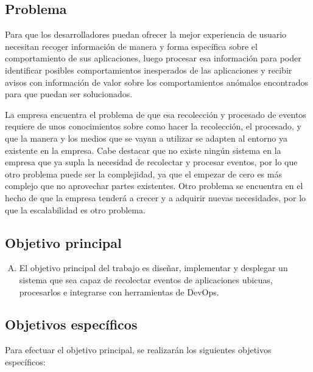 \subsection{Problema}
Para que los desarrolladores puedan ofrecer la mejor experiencia de usuario necesitan recoger información de manera y forma específica sobre el comportamiento de sus aplicaciones, luego procesar esa información para poder identificar posibles comportamientos inesperados de las aplicaciones y recibir avisos con información de valor sobre los comportamientos anómalos encontrados para que puedan ser solucionados.

La empresa encuentra el problema de que esa recolección y procesado de eventos requiere de unos conocimientos sobre como hacer la recolección, el procesado, y que la manera y los medios que se vayan a utilizar se adapten al entorno ya existente en la empresa. Cabe destacar que no existe ningún sistema en la empresa que ya supla la necesidad de recolectar y procesar eventos, por lo que otro problema puede ser la complejidad, ya que el empezar de cero es más complejo que no aprovechar partes existentes. Otro problema se encuentra en el hecho de que la empresa tenderá a crecer y a adquirir nuevas necesidades, por lo que la escalabilidad es otro problema.

\subsection{Objetivo principal}
\begin{enumerate}[A)]
	\item El objetivo principal del trabajo es diseñar, implementar y desplegar un sistema que sea capaz de recolectar eventos de aplicaciones ubicuas, procesarlos e integrarse con herramientas de DevOps.
\end{enumerate}

\subsection{Objetivos específicos}

Para efectuar el objetivo principal, se realizarán los siguientes objetivos específicos:

